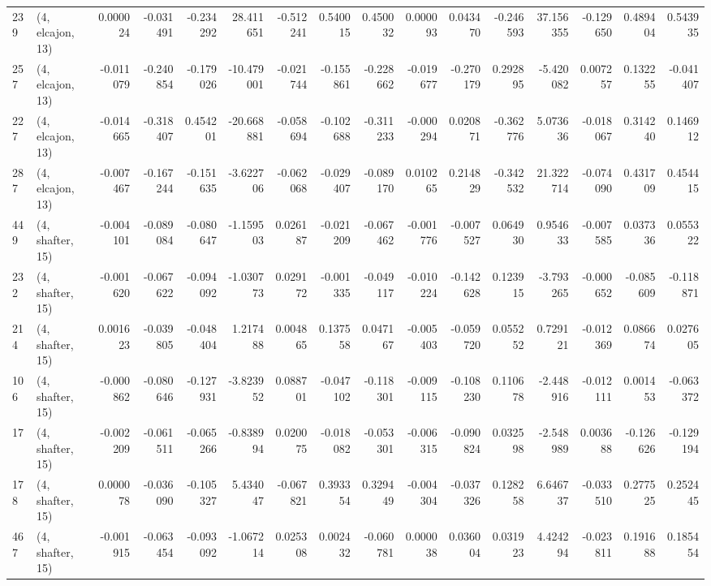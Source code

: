 \begin{tabular}{llrrrrrrrrrrrrrr}
239 &  (4, elcajon, 13) &   0.000024 & -0.031491 & -0.234292 &  28.411651 & -0.512241 &   0.540015 &  0.450032 &  0.000093 &  0.043470 & -0.246593 &    37.156355 &  -0.129650 &   0.489404 &   0.543935 \\
257 &  (4, elcajon, 13) &  -0.011079 & -0.240854 & -0.179026 & -10.479001 & -0.021744 &  -0.155861 & -0.228662 & -0.019677 & -0.270179 &  0.292895 &    -5.420082 &   0.007257 &   0.132255 &  -0.041407 \\
227 &  (4, elcajon, 13) &  -0.014665 & -0.318407 &  0.454201 & -20.668881 & -0.058694 &  -0.102688 & -0.311233 & -0.000294 &  0.020871 & -0.362776 &     5.073636 &  -0.018067 &   0.314240 &   0.146912 \\
287 &  (4, elcajon, 13) &  -0.007467 & -0.167244 & -0.151635 &  -3.622706 & -0.062068 &  -0.029407 & -0.089170 &  0.010265 &  0.214829 & -0.342532 &    21.322714 &  -0.074090 &   0.431709 &   0.454415 \\
449 &  (4, shafter, 15) &  -0.004101 & -0.089084 & -0.080647 &  -1.159503 &  0.026187 &  -0.021209 & -0.067462 & -0.001776 & -0.007527 &  0.064930 &     0.954633 &  -0.007585 &   0.037336 &   0.055322 \\
232 &  (4, shafter, 15) &  -0.001620 & -0.067622 & -0.094092 &  -1.030773 &  0.029172 &  -0.001335 & -0.049117 & -0.010224 & -0.142628 &  0.123915 &    -3.793265 &  -0.000652 &  -0.085609 &  -0.118871 \\
214 &  (4, shafter, 15) &   0.001623 & -0.039805 & -0.048404 &   1.217488 &  0.004865 &   0.137558 &  0.047167 & -0.005403 & -0.059720 &  0.055252 &     0.729121 &  -0.012369 &   0.086674 &   0.027605 \\
106 &  (4, shafter, 15) &  -0.000862 & -0.080646 & -0.127931 &  -3.823952 &  0.088701 &  -0.047102 & -0.118301 & -0.009115 & -0.108230 &  0.110678 &    -2.448916 &  -0.012111 &   0.001453 &  -0.063372 \\
17  &  (4, shafter, 15) &  -0.002209 & -0.061511 & -0.065266 &  -0.838994 &  0.020075 &  -0.018082 & -0.053301 & -0.006315 & -0.090824 &  0.032598 &    -2.548989 &   0.003688 &  -0.126626 &  -0.129194 \\
178 &  (4, shafter, 15) &   0.000078 & -0.036090 & -0.105327 &   5.434047 & -0.067821 &   0.393354 &  0.329449 & -0.004304 & -0.037326 &  0.128258 &     6.646737 &  -0.033510 &   0.277525 &   0.252445 \\
467 &  (4, shafter, 15) &  -0.001915 & -0.063454 & -0.093092 &  -1.067214 &  0.025308 &   0.002432 & -0.060781 &  0.000038 &  0.036004 &  0.031923 &     4.424294 &  -0.023811 &   0.191688 &   0.185454 \\

\end{tabular}
